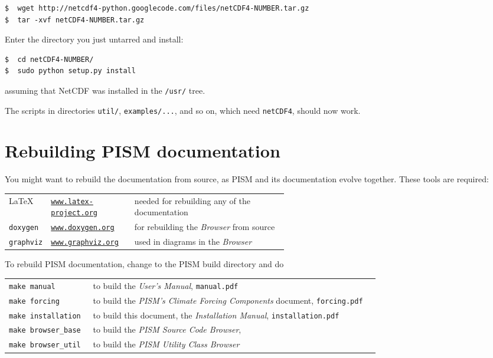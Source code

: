 \documentclass[titlepage,letterpaper,final]{scrartcl}
\begin{document}
\begin{verbatim}
$  wget http://netcdf4-python.googlecode.com/files/netCDF4-NUMBER.tar.gz
$  tar -xvf netCDF4-NUMBER.tar.gz
\end{verbatim}
Enter the directory you just untarred and install:
\begin{verbatim}
$  cd netCDF4-NUMBER/
$  sudo python setup.py install
\end{verbatim}
assuming that NetCDF was installed in the \texttt{/usr/} tree.

The scripts in directories \texttt{util/}, \texttt{examples/...}, and so on,
which need \texttt{netCDF4}, should now work.

\section{Rebuilding PISM documentation}
\label{sec:docs}

You might want to rebuild the documentation from source, as PISM and its
documentation evolve together. These tools are required: \bigskip
\begin{center}
  \begin{tabular*}{0.9\linewidth}{llp{0.55\linewidth}}
    \toprule
    \LaTeX & \href{http://www.latex-project.org/}{\texttt{www.latex-project.org}} &  needed for rebuilding any of the documentation \\
    \texttt{doxygen}\index{doxygen} & \href{http://www.stack.nl/~dimitri/doxygen/}{\texttt{www.doxygen.org}} &  for rebuilding the \emph{Browser} from source  \\
    \texttt{graphviz}\index{graphviz} & \href{http://www.graphviz.org/}{\texttt{www.graphviz.org}} &  used in diagrams in the \emph{Browser}  \\
    \bottomrule
  \end{tabular*}
\end{center}
\bigskip
\noindent To rebuild PISM documentation, change to the PISM build directory and do
\begin{center}
  \begin{tabular}{p{0.22\linewidth}p{0.75\linewidth}}
    \texttt{make manual} & to build the \emph{User's Manual}, \texttt{manual.pdf}\\
    \texttt{make forcing} & to build the \emph{PISM's Climate Forcing
      Components} document, \texttt{forcing.pdf} \\
    \texttt{make installation} & to build this document, the \emph{Installation Manual}, \texttt{installation.pdf}\\
    \texttt{make browser_base} & to build the \emph{PISM Source Code Browser},\\
    \texttt{make browser_util} & to build the \emph{PISM Utility Class Browser}\\
  \end{tabular}
\end{center}
\end{document}
